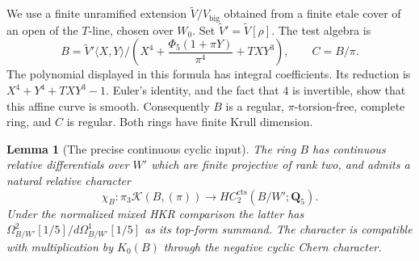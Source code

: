 \documentclass[11pt,a4paper]{article}
\newtheorem{lemma}[theorem]{Lemma}
\theoremstyle{remark}
\begin{document}
We use a finite unramified extension $\widetilde V/V_{\mathrm{big}}$ obtained from a
finite etale cover of an open of the $T$-line, chosen over $W_0$.
Set $\widetilde V'=\widetilde V[\rho]$. The test algebra is
\begin{equation}
 B=\widetilde V'\langle X,Y\rangle/
   \left(X^4+\frac{\Phi_5(1+\pi Y)}{\pi^4}+TXY^3\right),
 \qquad C=B/\pi.
\label{eq:dimensiontwotestalgebra}
\end{equation}
The polynomial displayed in this formula has integral coefficients.
Its reduction is $X^4+Y^4+TXY^3-1$. Euler's identity, and the fact
that $4$ is invertible, show that this affine curve is smooth.
Consequently $B$ is a regular, $\pi$-torsion-free, complete ring,
and $C$ is regular. Both rings have finite Krull dimension.

\begin{lemma}[The precise continuous cyclic input]
\label{lem:dimensiontwoAMMNinput}
The ring $B$ has continuous relative differentials over $W'$ which
are finite projective of rank two, and admits a natural relative
character
\[
 \chi_B:\pi_3\mathcal K(B,(\pi))
       \longrightarrow HC^{\mathrm{cts}}_2(B/W';\mathbf Q_5).
\]
Under the normalized mixed HKR comparison the latter has
$\Omega^2_{B/W'}[1/5]/d\Omega^1_{B/W'}[1/5]$ as its top-form
summand. The character is compatible with multiplication by
$K_0(B)$ through the negative cyclic Chern character.
\end{lemma}
\end{document}

